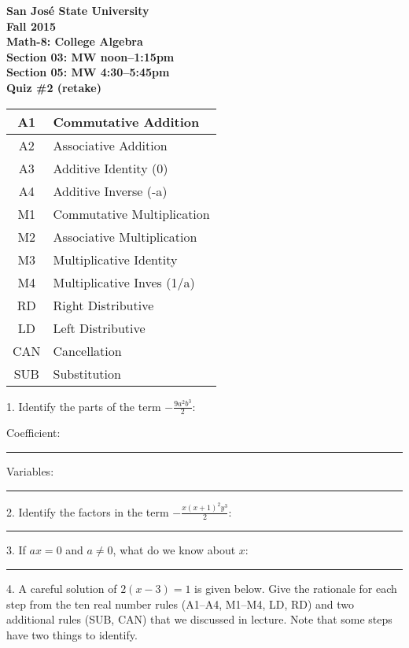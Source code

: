 \documentclass[letterpaper, 12pt]{article}
\begin{document}
\begin{center}
\bfseries
San Jos\'{e} State University \\
Fall 2015 \\
Math-8: College Algebra \\
Section 03: MW noon--1:15pm \\
Section 05: MW 4:30--5:45pm \\
\bigskip
Quiz \#2 (retake)
\end{center}

\bigskip

\begin{tabular}{|c|l|}
\hline
A1 & Commutative Addition \\
\hline
A2 & Associative Addition \\
\hline
A3 & Additive Identity (0) \\
\hline
A4 & Additive Inverse (-a) \\
\hline
M1 & Commutative Multiplication \\
\hline
M2 & Associative Multiplication \\
\hline
M3 & Multiplicative Identity \\
\hline
M4 & Multiplicative Inves (1/a) \\
\hline
RD & Right Distributive \\
\hline
LD & Left Distributive \\
\hline
CAN & Cancellation \\
\hline
SUB & Substitution \\
\hline
\end{tabular}

\newcommand{\fillin}{\rule{1in}{1pt}}

\vspace{1in}

1. Identify the parts of the term $-\frac{9a^2b^3}{2}$:

\bigskip

Coefficient: \fillin

\bigskip

Variables: \fillin

\bigskip

2. Identify the factors in the term $-\frac{x(x+1)^2y^3}{2}$: \fillin

\bigskip

3. If $ax=0$ and $a\ne0$, what do we know about $x$: \fillin

\newpage

4. A careful solution of $2(x-3)=1$ is given below. Give the rationale for each
step from the ten real number rules (A1--A4, M1--M4, LD, RD) and two additional
rules (SUB, CAN) that we discussed in lecture.  Note that some steps have two
things to identify.
\end{document}
